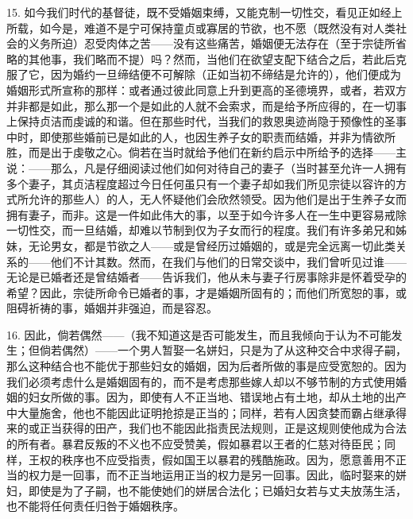 15. 如今我们时代的基督徒，既不受婚姻束缚，又能克制一切性交，看见正如经上所载，如今是，难道不是宁可保持童贞或寡居的节欲，也不愿（既然没有对人类社会的义务所迫）忍受肉体之苦——没有这些痛苦，婚姻便无法存在（至于宗徒所省略的其他事，我们略而不提）吗？然而，当他们在欲望支配下结合之后，若此后克服了它，因为婚约一旦缔结便不可解除（正如当初不缔结是允许的），他们便成为婚姻形式所宣称的那样：或者通过彼此同意上升到更高的圣德境界，或者，若双方并非都是如此，那么那一个是如此的人就不会索求，而是给予所应得的，在一切事上保持贞洁而虔诚的和谐。但在那些时代，当我们的救恩奥迹尚隐于预像性的圣事中时，即使那些婚前已是如此的人，也因生养子女的职责而结婚，并非为情欲所胜，而是出于虔敬之心。倘若在当时就给予他们在新约启示中所给予的选择——主说：——那么，凡是仔细阅读过他们如何对待自己的妻子（当时甚至允许一人拥有多个妻子，其贞洁程度超过今日任何虽只有一个妻子却如我们所见宗徒以容许的方式所允许的那些人）的人，无人怀疑他们会欣然领受。因为他们是出于生养子女而拥有妻子，而非。这是一件如此伟大的事，以至于如今许多人在一生中更容易戒除一切性交，而一旦结婚，却难以节制到仅为子女而行的程度。我们有许多弟兄和姊妹，无论男女，都是节欲之人——或是曾经历过婚姻的，或是完全远离一切此类关系的——他们不计其数。然而，在我们与他们的日常交谈中，我们曾听见过谁——无论是已婚者还是曾结婚者——告诉我们，他从未与妻子行房事除非是怀着受孕的希望？因此，宗徒所命令已婚者的事，才是婚姻所固有的；而他们所宽恕的事，或阻碍祈祷的事，婚姻并非强迫，而是容忍。\par

16. 因此，倘若偶然——（我不知道这是否可能发生，而且我倾向于认为不可能发生；但倘若偶然）——一个男人暂娶一名姘妇，只是为了从这种交合中求得子嗣，那么这种结合也不能优于那些妇女的婚姻，因为后者所做的事是应受宽恕的。因为我们必须考虑什么是婚姻固有的，而不是考虑那些嫁人却以不够节制的方式使用婚姻的妇女所做的事。因为，即使有人不正当地、错误地占有土地，却从土地的出产中大量施舍，他也不能因此证明抢掠是正当的；同样，若有人因贪婪而霸占继承得来的或正当获得的田产，我们也不能因此指责民法规则，正是这规则使他成为合法的所有者。暴君反叛的不义也不应受赞美，假如暴君以王者的仁慈对待臣民；同样，王权的秩序也不应受指责，假如国王以暴君的残酷施政。因为，愿意善用不正当的权力是一回事，而不正当地运用正当的权力是另一回事。因此，临时娶来的姘妇，即使是为了子嗣，也不能使她们的姘居合法化；已婚妇女若与丈夫放荡生活，也不能将任何责任归咎于婚姻秩序。\par

